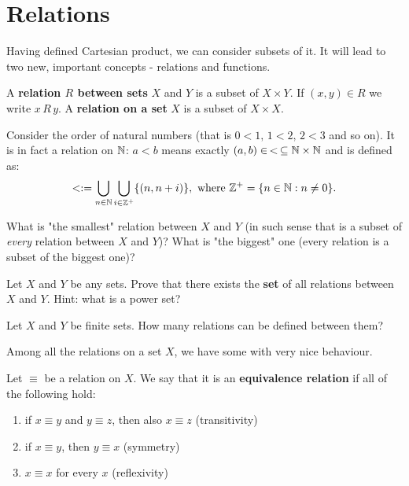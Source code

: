 \section{Relations}
Having defined Cartesian product, we can consider subsets of it. It will lead to two new, important concepts - relations and functions.

\begin{definition}
  A \textbf{relation $R$ between sets} $X$ and $Y$ is a subset of $X\times Y$. If $(x,y)\in R$ we write $x\,R\,y$. A \textbf{relation on a set} $X$ is a subset of $X\times X$.
\end{definition}

\begin{example}
  Consider the order of natural numbers (that is $0<1, \,1<2,\,2<3$ and so on). It is in fact a relation on $\mathbb N$: $a<b$ means exactly $(a,b)\in\, <\,\subseteq \mathbb N\times \mathbb N$ and is defined as:
  $$< := \bigcup_{n\in \mathbb N}\bigcup_{i\in \mathbb Z^+} \{(n, n+i)\}, \text{ where } \mathbb Z^+=\{n\in \mathbb N : n\neq 0\}.$$
\end{example}

\begin{exercise}
  What is "the smallest" relation between $X$ and $Y$ (in such sense that is a subset of \emph{every} relation between $X$ and $Y$)? What is "the biggest" one (every relation is a subset of the biggest one)?
\end{exercise}

\begin{exercise}
 Let $X$ and $Y$ be any sets. Prove that there exists the \textbf{set} of all relations between $X$ and $Y$. Hint: what is a power set?
\end{exercise}

\begin{exercise}
  Let $X$ and $Y$ be finite sets. How many relations can be defined between them?
\end{exercise}

Among all the relations on a set $X$, we have some with very nice behaviour.

\begin{definition}
  Let $\equiv$ be a relation on $X$. We say that it is an \textbf{equivalence relation} if all of the following hold:
  \begin{enumerate}
    \item if $x\equiv y$ and $y\equiv z$, then also $x\equiv z$ (transitivity)
    \item if $x\equiv y$, then $y\equiv x$ (symmetry)
    \item $x\equiv x$ for every $x$ (reflexivity)
  \end{enumerate}
\end{definition}

